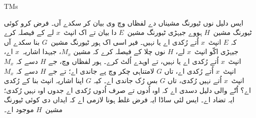 \documentclass[../../../include/open-logic-section]{subfiles}
\begin{document}
\begin{tagblock}{TMs}
\begin{explain}
ایس دلیل نوں ٹیورنگ مشیناں دے لفظاں وچ وی بیان کر سکدے آں۔
فرض کرو کوئی ٹیورنگ مشین~$H$ ہووے جیہڑی ٹیورنگ مشین~$E$
دا بیان تے اک انپٹ~$x$ لے کے فیصلہ کرے کہ $E$ انپٹ~$x$
اُتے رُکدی اے یا نہیں۔ فیر اسی اک ہور ٹیورنگ مشین~$G$
بنا سکدے آں جیہڑی اکّو انپٹ~$x$ لے، $H$ نوں چلا کے
فیصلہ کرے کہ مشین $M_x$، جیہدا اشاریہ~$x$ اے، انپٹ~$x$
اُتے رُکدی اے یا نہیں، تے اوہدے اُلٹ کرے۔ ہور لفظاں وچ،
جے $H$ دسے کہ $M_x$ انپٹ~$x$ اُتے رُکدی اے، تاں $G$
لامتناہی چکر وچ پے جاندی اے؛ تے جے $H$ دسے کہ $M_x$
انپٹ~$x$ اُتے نہیں رُکدی، تاں $G$ بس رُک جاندی اے۔
کیہ $G$ اپنا اشاریہ انپٹ بنا کے رُکدی اے؟ اُتّے والی
دلیل دسدی اے کہ اوہ اُدوں تے صرف اُدوں رُکدی اے جدوں
اوہ نہیں رُکدی؛ ایہ تضاد اے۔ ایس لئی ساڈا ایہ فرض غلط
ہونا لازمی اے کہ ایداں دی کوئی ٹیورنگ مشین~$H$ موجود اے۔
\end{explain}
\end{tagblock}
\end{document}
